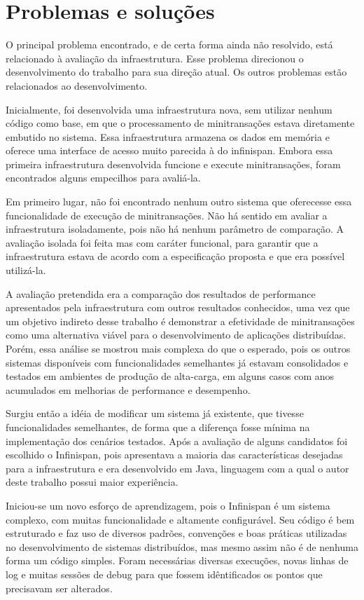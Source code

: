 \documentclass[11pt,twoside,a4paper]{book}
\begin{document}
\section{Problemas e soluções}
\label{sec:problemas_solucoes}

O principal problema encontrado, e de certa forma ainda não resolvido, está relacionado à avaliação da infraestrutura. Esse problema direcionou o desenvolvimento do trabalho para sua direção atual. Os outros problemas estão relacionados ao desenvolvimento.

Inicialmente, foi desenvolvida uma infraestrutura nova, sem utilizar nenhum código como base, em que o processamento de minitransações estava diretamente embutido no sistema. Essa infraestrutura armazena os dados em memória e oferece uma interface de acesso muito parecida à do infinispan. Embora essa primeira infraestrutura desenvolvida funcione e execute minitransações, foram encontrados alguns empecilhos para avaliá-la.

Em primeiro lugar, não foi encontrado nenhum outro sistema que oferecesse essa funcionalidade de execução de minitransações. Não há sentido em avaliar a infraestrutura isoladamente, pois não há nenhum parâmetro de comparação. A avaliação isolada foi feita mas com caráter funcional, para garantir que a infraestrutura estava de acordo com a especificação proposta e que era possível utilizá-la.

A avaliação pretendida era a comparação dos resultados de performance apresentados pela infraestrutura com outros resultados conhecidos, uma vez que um objetivo indireto desse trabalho é demonstrar a efetividade de minitransações como uma alternativa viável para o desenvolvimento de aplicações distribuídas. Porém, essa análise se mostrou mais complexa do que o esperado, pois os outros sistemas disponíveis com funcionalidades semelhantes já estavam consolidados e testados em ambientes de produção de alta-carga, em alguns casos com anos acumulados em melhorias de performance e desempenho.

Surgiu então a idéia de modificar um sistema já existente, que tivesse funcionalidades semelhantes, de forma que a diferença fosse mínima na implementação dos cenários testados. Após a avaliação de alguns candidatos foi escolhido o Infinispan, pois apresentava a maioria das características desejadas para a infraestrutura e era desenvolvido em Java, linguagem com a qual o autor deste trabalho possui maior experiência.

Iniciou-se um novo esforço de aprendizagem, pois o Infinispan é um sistema complexo, com muitas funcionalidade e altamente configurável. Seu código é bem estruturado e faz uso de diversos padrões, convenções e boas práticas utilizadas no desenvolvimento de sistemas distribuídos, mas mesmo assim não é de nenhuma forma um código simples. Foram necessárias diversas execuções, novas linhas de log e muitas sessões de debug para que fossem idêntificados os pontos que precisavam ser alterados. 
\end{document}
